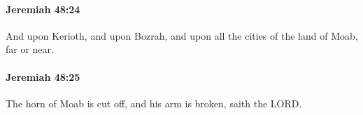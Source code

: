 		\paragraph{Jeremiah 48:24} %
			\label{JEREMIAH-48-24}

			And upon Kerioth, and upon Bozrah, and upon all the cities of the land of Moab, far or near.


		\paragraph{Jeremiah 48:25} %
			\label{JEREMIAH-48-25}

			The horn of Moab is cut off, and his arm is broken, saith the LORD.


